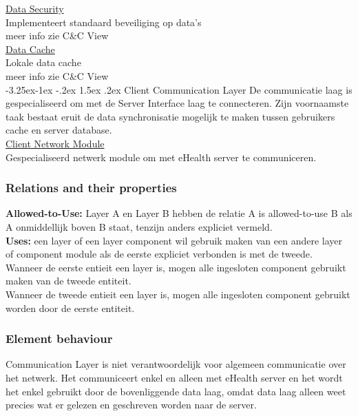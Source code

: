 \documentclass[a4paper,10pt]{article}
\makeatletter
\renewcommand\paragraph{\@startsection{paragraph}{4}{\z@}%
  {-3.25ex\@plus -1ex \@minus -.2ex}%
  {1.5ex \@plus .2ex}%
  {\normalfont\normalsize\bfseries}}
\makeatother
\begin{document}
\underline{Data Security}\\
Implementeert standaard beveiliging op data's\\
meer info zie C\&C View\\

\underline{Data Cache}\\
Lokale data cache\\
meer info zie C\&C View\\

\paragraph{Client Communication Layer}
De communicatie laag is gespecialiseerd om met de Server Interface laag te connecteren.
Zijn voornaamste taak bestaat eruit de data synchronisatie  mogelijk te maken tussen gebruikers cache en server database.\\


\underline{Client Network Module}\\
Gespecialiseerd netwerk module om met eHealth server te communiceren.\\


\subsubsection*{Relations and their properties}
\textbf{Allowed-to-Use:} Layer A en Layer B hebben de relatie A is allowed-to-use B als A onmiddellijk boven B staat, tenzijn anders expliciet vermeld.\\

\textbf{Uses:} een layer of een layer component wil gebruik maken van een andere layer of component module als de eerste expliciet verbonden is met de tweede.\\
Wanneer de eerste entieit een layer is, mogen alle ingesloten component gebruikt maken van de tweede entiteit.\\
Wanneer de tweede entieit een layer is, mogen alle ingesloten component gebruikt worden door de eerste entiteit.\\

\subsubsection*{Element behaviour}
Communication Layer is niet verantwoordelijk voor algemeen communicatie over het netwerk. Het communiceert enkel en alleen met eHealth server en het wordt het enkel gebruikt door de bovenliggende data laag, omdat data laag alleen weet precies wat er gelezen en geschreven worden naar de server.
\end{document}

